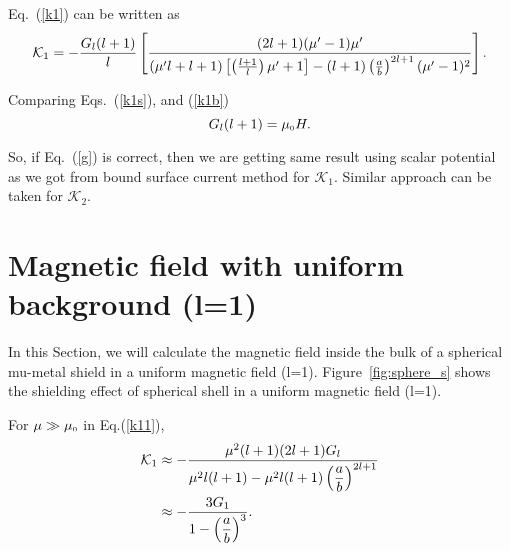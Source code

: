 Eq.~(\ref{k1}) can be written as
\begin{equation}\label{k1b}
\mathcal{K}_1=-\frac{G_l (l+1)}{l}\left[\frac{(2l+1)(\mu'-1)\mu'}{(\mu'l+l+1)\left[\left(\frac{l+1}{l}\right)\mu'+1\right]-(l+1)\left(\frac{a}{b}\right)^{2l+1}(\mu'-1)^2}\right]{\rm .}
\end{equation}

Comparing Eqs.~(\ref{k1s}), and (\ref{k1b})
\begin{equation}\label{g}
G_l(l+1)=\mu_{\scriptscriptstyle 0} H{\rm .}
\end{equation}

So, if Eq.~(\ref{g}) is correct, then we are getting same result using scalar potential as we got from bound surface current method for $\mathcal{K}_1$. Similar approach can be taken for $\mathcal{K}_2$.


\section{Magnetic field with uniform background (l=1)}\label{sec:uniform}


In this Section, we will calculate the magnetic field inside the bulk of a spherical mu-metal shield in a uniform magnetic field (l=1). Figure~\ref{fig:sphere_s} shows the shielding effect of spherical shell in a uniform magnetic field (l=1). 

For \(\mu\gg\mu_{\scriptscriptstyle 0}\) in Eq.(\ref{k11}),
\begin{equation}\label{k12}
\begin{split}
\mathcal{K}_1 & \approx-\frac{\mu^2(l+1) (2l+1)G_l}{\mu^2 l(l+1)-\mu^2 l(l+1)\left(\dfrac{a}{b}\right)^{2l+1}}\\
& \approx-\frac{3 G_1}{1-\left(\dfrac{a}{b}\right)^{3}}{\rm .}
\end{split}
\end{equation}


